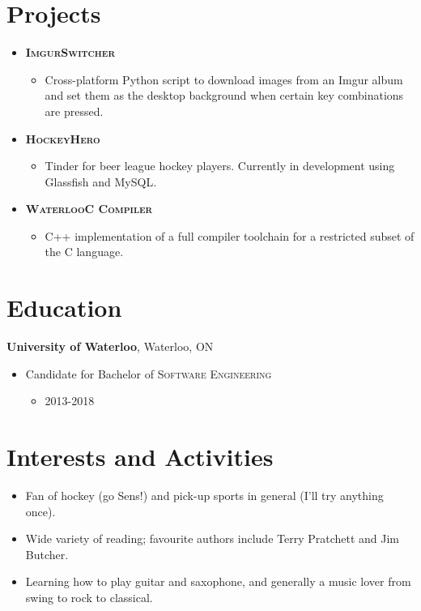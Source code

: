 \documentclass[a4paper,10pt]{article}
\begin{document}
\section{Projects}
\begin{itemize}
	\item {\textsc{\textbf{ImgurSwitcher}}}
	\begin{itemize}
		\item {Cross-platform Python script to download images from an Imgur album and set them as the desktop background when certain key combinations are pressed.}
	\end{itemize}
	
	\item {\textsc{\textbf{HockeyHero}}}
	\begin{itemize}
		\item {Tinder for beer league hockey players. Currently in development using Glassfish and MySQL.}
	\end{itemize}
	
	\item {\textsc{\textbf{WaterlooC Compiler}}}
	\begin{itemize}
		\item {C++ implementation of a full compiler toolchain for a restricted subset of the C language.}
	\end{itemize}	
\end{itemize}

\section{Education}
\textbf{University of Waterloo}, Waterloo, ON
\begin{itemize}
	\item Candidate for Bachelor of \textsc{Software Engineering}
	\begin{itemize}
		\item \textsc{2013-2018}
	\end{itemize}
\end{itemize}

\section{Interests and Activities}
\begin{itemize}
	\item {Fan of hockey (go Sens!) and pick-up sports in general (I'll try anything once).}
	\item {Wide variety of reading; favourite authors include Terry Pratchett and Jim Butcher.}
	\item {Learning how to play guitar and saxophone, and generally a music lover from swing to rock to classical.}
\end{itemize}
\end{document}
